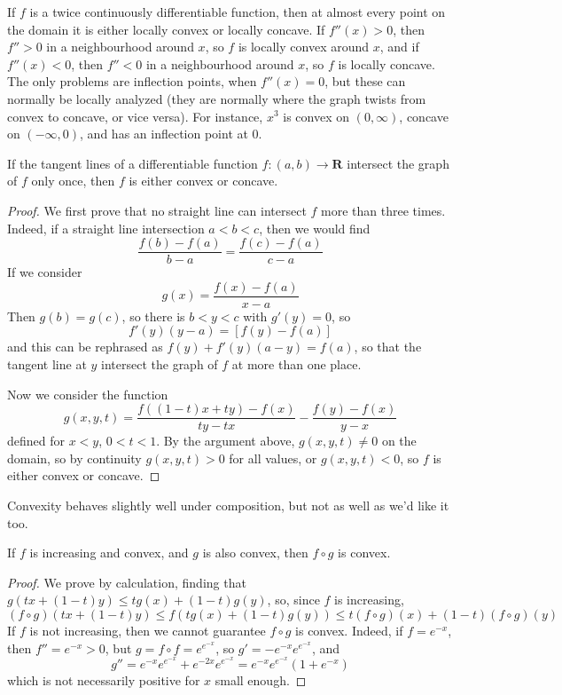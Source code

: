 If $f$ is a twice continuously differentiable function, then at almost every point on the domain it is either locally convex or locally concave. If $f''(x) > 0$, then $f'' > 0$ in a neighbourhood around $x$, so $f$ is locally convex around $x$, and if $f''(x) < 0$, then $f'' < 0$ in a neighbourhood around $x$, so $f$ is locally concave. The only problems are inflection points, when $f''(x) = 0$, but these can normally be locally analyzed (they are normally where the graph twists from convex to concave, or vice versa). For instance, $x^3$ is convex on $(0,\infty)$, concave on $(-\infty,0)$, and has an inflection point at $0$.

\begin{theorem}
    If the tangent lines of a differentiable function $f:(a,b) \to \mathbf{R}$ intersect the graph of $f$ only once, then $f$ is either convex or concave.
\end{theorem}
\begin{proof}
    We first prove that no straight line can intersect $f$ more than three times. Indeed, if a straight line intersection $a < b < c$, then we would find
    \[ \frac{f(b) - f(a)}{b - a} = \frac{f(c) - f(a)}{c - a} \]
    If we consider
    \[ g(x) = \frac{f(x) - f(a)}{x - a} \]
    Then $g(b) = g(c)$, so there is $b < y < c$ with $g'(y) = 0$, so
    \[ f'(y)(y - a) = [f(y) - f(a)] \]
    and this can be rephrased as $f(y) + f'(y)(a - y) = f(a)$, so that the tangent line at $y$ intersect the graph of $f$ at more than one place.

    Now we consider the function
    \[ g(x,y,t) = \frac{f((1-t)x + ty) - f(x)}{ty - tx} - \frac{f(y) - f(x)}{y - x} \]
    defined for $x < y$, $0 < t < 1$. By the argument above, $g(x,y,t) \neq 0$ on the domain, so by continuity $g(x,y,t) > 0$ for all values, or $g(x,y,t) < 0$, so $f$ is either convex or concave.
\end{proof}

Convexity behaves slightly well under composition, but not as well as we'd like it too.

\begin{theorem}
    If $f$ is increasing and convex, and $g$ is also convex, then $f \circ g$ is convex.
\end{theorem}
\begin{proof}
    We prove by calculation, finding that $g(tx + (1-t)y) \leq tg(x) + (1-t)g(y)$, so, since $f$ is increasing,
    \[ (f \circ g)(tx + (1 - t)y) \leq f(tg(x) + (1 - t)g(y)) \leq t(f \circ g)(x) + (1-t)(f \circ g)(y) \]
    If $f$ is not increasing, then we cannot guarantee $f \circ g$ is convex. Indeed, if $f = e^{-x}$, then $f'' = e^{-x} > 0$, but $g = f \circ f = e^{e^{-x}}$, so $g' = -e^{-x}e^{e^{-x}}$, and
    \[ g'' = e^{-x}e^{e^{-x}} + e^{-2x} e^{e^{-x}} = e^{-x}e^{e^{-x}}(1 + e^{-x}) \]
    which is not necessarily positive for $x$ small enough.
\end{proof}

